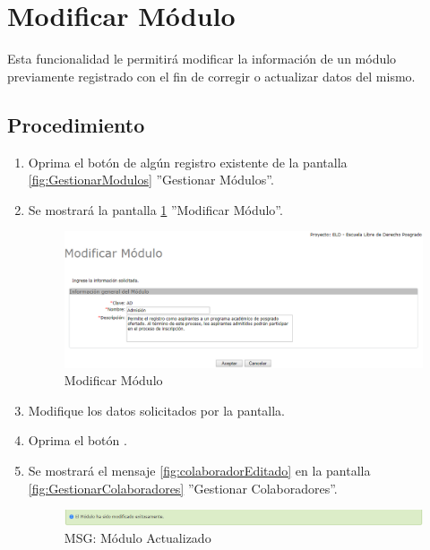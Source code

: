 \hypertarget{cv:modificarModulo}{\section{Modificar Módulo}} \label{sec:modificarModulo}

	Esta funcionalidad le permitirá modificar la información de un módulo previamente registrado con el fin de corregir o actualizar datos del mismo. 

		\subsection{Procedimiento}

			\begin{enumerate}
	
			\item Oprima el botón \IUEditar{} de algún registro existente de la pantalla \ref{fig:GestionarModulos} ''Gestionar Módulos''.
	
			\item Se mostrará la pantalla \ref{fig:modificarModulo} ''Modificar Módulo''.
			
			\begin{figure}[htbp!]
				\begin{center}
					\includegraphics[scale=0.6]{roles/lider/modulos/pantallas/IU5-2modificarModulo}
					\caption{Modificar Módulo}
					\label{fig:modificarModulo}
				\end{center}
			\end{figure}
		
			\item Modifique los datos solicitados por la pantalla.
						
			\item Oprima el botón \IUAceptar.
			
			\item Se mostrará el mensaje \ref{fig:colaboradorEditado} en la pantalla \ref{fig:GestionarColaboradores} ''Gestionar Colaboradores''.
			
			\begin{figure}[htbp!]
				\begin{center}
					\includegraphics[scale=0.6]{roles/lider/modulos/pantallas/IU5-2MSG1}
					\caption{MSG: Módulo Actualizado}
					\label{fig:moduloModificado}
				\end{center}
			\end{figure}
			\end{enumerate}